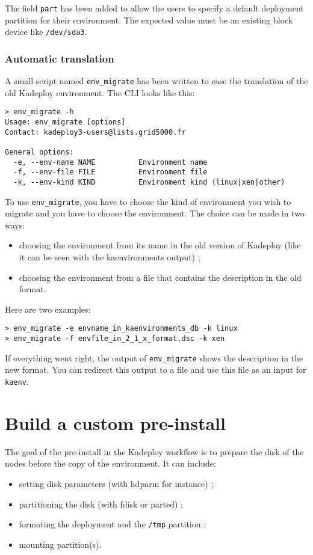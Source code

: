 \documentclass[a4wide,10pt,oneside]{book}
\begin{document}
The field \texttt{part} has been added to allow the users to specify a default deployment partition for their environment. The expected value must be an existing block device like \texttt{/dev/sda3}.

\subsubsection{Automatic translation}
A small script named \texttt{env\_migrate} has been written to ease the translation of the old Kadeploy environment. The CLI looks like this:

\begin{small}
\begin{verbatim}
> env_migrate -h
Usage: env_migrate [options]
Contact: kadeploy3-users@lists.grid5000.fr

General options:
  -e, --env-name NAME          Environment name
  -f, --env-file FILE          Environment file
  -k, --env-kind KIND          Environment kind (linux|xen|other)
\end{verbatim}
\end{small}

To use \texttt{env\_migrate}, you have to choose the kind of environment you wish to migrate and you have to choose the environment. The choice can be made in two ways:
\begin{itemize}
\item choosing the environment from its name in the old version of Kadeploy (like it can be seen with the kaenvironments output) ;
\item choosing the environment from a file that contains the description in the old format.
\end{itemize}

Here are two examples:
\begin{small}
\begin{verbatim}
> env_migrate -e envname_in_kaenvironments_db -k linux
> env_migrate -f envfile_in_2_1_x_format.dsc -k xen
\end{verbatim}
\end{small}

If everything went right, the output of \texttt{env\_migrate} shows the description in the new format. You can redirect this output to a file and use this file as an input for \texttt{kaenv}.

\section{Build a custom pre-install}\label{sec:custom-preinstall}
The goal of the pre-install in the Kadeploy workflow is to prepare the disk of the nodes before the copy of the environment. It can include:
\begin{itemize}
\item setting disk parameters (with hdparm for instance) ;
\item partitioning the disk (with fdisk or parted) ;
\item formating the deployment and the \texttt{/tmp} partition ;
\item mounting partition(s).
\end{itemize}
\end{document}
